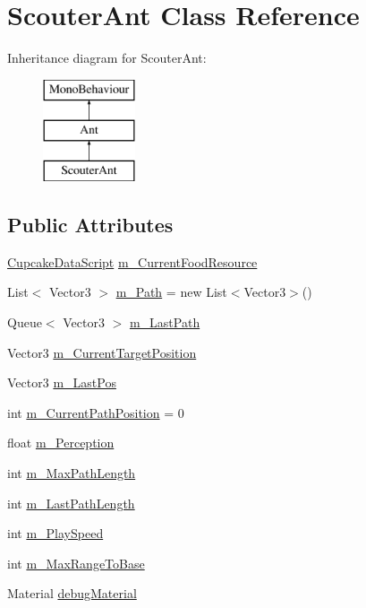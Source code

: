 \hypertarget{class_scouter_ant}{}\section{Scouter\+Ant Class Reference}
\label{class_scouter_ant}
Inheritance diagram for Scouter\+Ant\+:\begin{figure}[H]
\begin{center}
\leavevmode
\includegraphics[height=3.000000cm]{class_scouter_ant}
\end{center}
\end{figure}
\subsection*{Public Attributes}
\begin{DoxyCompactItemize}
\item 
\mbox{\hyperlink{class_cupcake_data_script}{Cupcake\+Data\+Script}} \mbox{\hyperlink{class_scouter_ant_a7ae9104cb0377eb629f85f4d52afcbc4}{m\+\_\+\+Current\+Food\+Resource}}
\item 
List$<$ Vector3 $>$ \mbox{\hyperlink{class_scouter_ant_a1e85f3293ccd5e8db2f7390501f251c8}{m\+\_\+\+Path}} = new List$<$Vector3$>$()
\item 
Queue$<$ Vector3 $>$ \mbox{\hyperlink{class_scouter_ant_a78b986fd875305b68d265a3cb7e2a0ea}{m\+\_\+\+Last\+Path}}
\item 
Vector3 \mbox{\hyperlink{class_scouter_ant_adf1d6e5d0f4887b91d2e9f90b72743f1}{m\+\_\+\+Current\+Target\+Position}}
\item 
Vector3 \mbox{\hyperlink{class_scouter_ant_a310baf521731362ee059fc5698465d74}{m\+\_\+\+Last\+Pos}}
\item 
int \mbox{\hyperlink{class_scouter_ant_a9573871e0ebaed1127de4fd6356ca3a7}{m\+\_\+\+Current\+Path\+Position}} = 0
\item 
float \mbox{\hyperlink{class_scouter_ant_a61a72077d3d00a3e9d9cbceb1b2a6c13}{m\+\_\+\+Perception}}
\item 
int \mbox{\hyperlink{class_scouter_ant_aad5401f6de54cf15cc2c3648dfe00ce8}{m\+\_\+\+Max\+Path\+Length}}
\item 
int \mbox{\hyperlink{class_scouter_ant_aabaadc9d9e9e77472bb9a08c57d40e05}{m\+\_\+\+Last\+Path\+Length}}
\item 
int \mbox{\hyperlink{class_scouter_ant_af358799b1539611777fb416c823b7d00}{m\+\_\+\+Play\+Speed}}
\item 
int \mbox{\hyperlink{class_scouter_ant_ae9b4fd2ec2130fb05fd8bbd0210ab5b7}{m\+\_\+\+Max\+Range\+To\+Base}}
\item 
Material \mbox{\hyperlink{class_scouter_ant_a29fa1fc113add533eb83681586e9303e}{debug\+Material}}
\end{DoxyCompactItemize}
